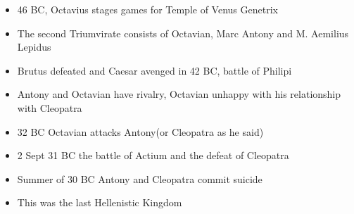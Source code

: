 \documentclass[12pt,a4paper]{report}
\begin{document}
\begin{itemize}
\item 46 BC, Octavius stages games for Temple of Venus Genetrix
\item The second Triumvirate consists of Octavian, Marc Antony and M. Aemilius Lepidus
\item Brutus defeated and Caesar avenged in 42 BC, battle of Philipi
\item Antony and Octavian have rivalry, Octavian unhappy with his relationship with Cleopatra
\item 32 BC Octavian attacks Antony(or Cleopatra as he said)
\item 2 Sept 31 BC the battle of Actium and the defeat of Cleopatra
\item Summer of 30 BC Antony and Cleopatra commit suicide
\item This was the last Hellenistic Kingdom
\end{itemize}
\end{document}
